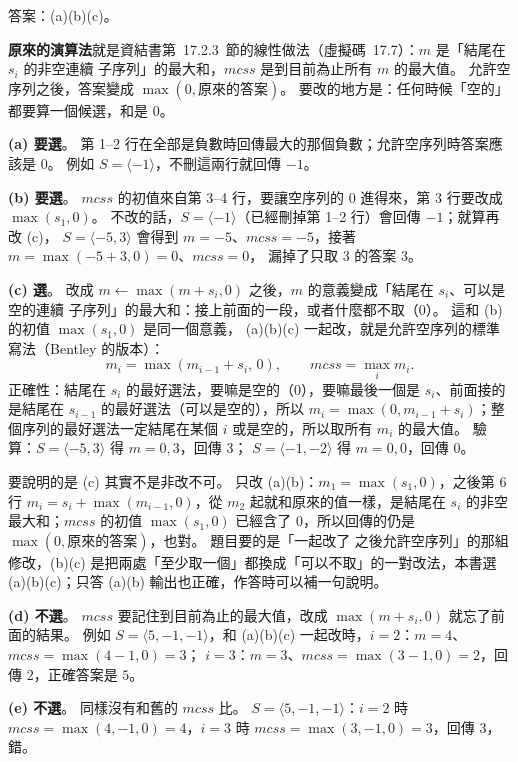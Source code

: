 \begin{pastsoln}
答案：(a)(b)(c)。

\textbf{原來的演算法}就是資結書第~17.2.3~節的線性做法（虛擬碼~17.7）：$m$ 是「結尾在 $s_i$ 的非空連續
子序列」的最大和，$mcss$ 是到目前為止所有 $m$ 的最大值。 允許空序列之後，答案變成
$\max(0, \text{原來的答案})$。 要改的地方是：任何時候「空的」都要算一個候選，和是 $0$。

\textbf{(a) 要選}。 第 1--2 行在全部是負數時回傳最大的那個負數；允許空序列時答案應該是 $0$。 例如
$S = \langle -1 \rangle$，不刪這兩行就回傳 $-1$。

\textbf{(b) 要選}。 $mcss$ 的初值來自第 3--4 行，要讓空序列的 $0$ 進得來，第 3 行要改成
$\max(s_1, 0)$。 不改的話，$S = \langle -1 \rangle$（已經刪掉第 1--2 行）會回傳 $-1$；就算再改 (c)，
$S = \langle -5, 3 \rangle$ 會得到 $m = -5$、$mcss = -5$，接著 $m = \max(-5 + 3, 0) = 0$、$mcss = 0$，
漏掉了只取 $3$ 的答案 $3$。

\textbf{(c) 選}。 改成 $m \gets \max(m + s_i, 0)$ 之後，$m$ 的意義變成「結尾在 $s_i$、可以是空的連續
子序列」的最大和：接上前面的一段，或者什麼都不取（$0$）。 這和 (b) 的初值 $\max(s_1, 0)$ 是同一個意義，
(a)(b)(c) 一起改，就是允許空序列的標準寫法（Bentley 的版本）：
\[
m_i = \max(m_{i-1} + s_i,\, 0), \qquad \mathit{mcss} = \max_i m_i .
\]
正確性：結尾在 $s_i$ 的最好選法，要嘛是空的（$0$），要嘛最後一個是 $s_i$、前面接的是結尾在 $s_{i-1}$
的最好選法（可以是空的），所以 $m_i = \max(0, m_{i-1} + s_i)$；整個序列的最好選法一定結尾在某個 $i$
或是空的，所以取所有 $m_i$ 的最大值。 驗算：$S = \langle -5, 3 \rangle$ 得 $m = 0, 3$，回傳 $3$；
$S = \langle -1, -2 \rangle$ 得 $m = 0, 0$，回傳 $0$。

要說明的是 (c) 其實不是非改不可。 只改 (a)(b)：$m_1 = \max(s_1, 0)$，之後第 6 行
$m_i = s_i + \max(m_{i-1}, 0)$，從 $m_2$ 起就和原來的值一樣，是結尾在 $s_i$ 的非空最大和；$mcss$ 的初值
$\max(s_1, 0)$ 已經含了 $0$，所以回傳的仍是 $\max(0, \text{原來的答案})$，也對。 題目要的是「一起改了
之後允許空序列」的那組修改，(b)(c) 是把兩處「至少取一個」都換成「可以不取」的一對改法，本書選
(a)(b)(c)；只答 (a)(b) 輸出也正確，作答時可以補一句說明。

\textbf{(d) 不選}。 $mcss$ 要記住到目前為止的最大值，改成 $\max(m + s_i, 0)$ 就忘了前面的結果。 例如
$S = \langle 5, -1, -1 \rangle$，和 (a)(b)(c) 一起改時，$i = 2$：$m = 4$、$mcss = \max(4 - 1, 0) = 3$；
$i = 3$：$m = 3$、$mcss = \max(3 - 1, 0) = 2$，回傳 $2$，正確答案是 $5$。

\textbf{(e) 不選}。 同樣沒有和舊的 $mcss$ 比。 $S = \langle 5, -1, -1 \rangle$：$i = 2$ 時
$mcss = \max(4, -1, 0) = 4$，$i = 3$ 時 $mcss = \max(3, -1, 0) = 3$，回傳 $3$，錯。
\end{pastsoln}

